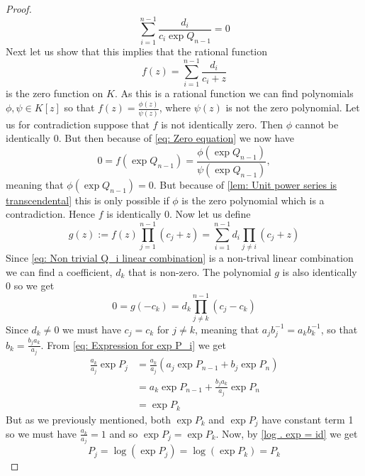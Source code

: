\documentclass{article}
\numberwithin{equation}{section}
\begin{document}
\begin{proof}
\begin{equation}
        \sum_{i=1}^{n-1} \frac{d_i}{c_i \exp Q_{n-1}} = 0
    \end{equation}
    Next let us show that this implies that the rational function
    $$f(z) = \sum_{i=1}^{n-1}\frac{d_i}{c_i + z}$$
    is the zero function on $K$. As this is a rational function we can find polynomials $\phi, \psi \in K[z]$ so that $f(z) = \frac{\phi(z)}{\psi(z)}$, where $\psi(z)$ is not the zero polynomial. Let us for contradiction suppose that $f$ is not identically zero. Then $\phi$ cannot be identically 0. But then because of \cref{eq: Zero equation} we now have
    $$0 = f(\exp Q_{n-1}) = \frac{\phi(\exp Q_{n-1})}{\psi(\exp Q_{n-1})},$$
    meaning that $\phi(\exp Q_{n-1}) = 0$. But because of \cref{lem: Unit power series is transcendental} this is only possible if $\phi$ is the zero polynomial which is a contradiction. Hence $f$ is identically 0. Now let us define
    $$g(z) := f(z) \prod_{j=1}^{n-1}(c_j + z)  = \sum_{i = 1}^{n-1}d_i\prod_{j \neq i}(c_j + z)$$
    Since \cref{eq: Non trivial Q_i linear combination} is a non-trival linear combination we can find a coefficient, $d_k$ that is non-zero. The polynomial $g$ is also identically 0 so we get $$0 = g(-c_k) = d_k\prod_{j \neq k}^{n-1} (c_j - c_k)$$
    Since $d_k \neq 0$ we must have $c_j = c_k$ for $j \neq k$, meaning that $a_j b_j^{-1} = a_k b_k^{-1}$, so that $b_k = \frac{b_j a_k}{a_j}$. From \cref{eq: Expression for exp P_i} we get
    \begin{align*}
        \frac{a_k}{a_j}\exp P_j & = \frac{a_k}{a_j}(a_j \exp P_{n-1} + b_j \exp P_n) \\
                                & = a_k \exp P_{n-1} + \frac{b_j a_k}{a_j} \exp P_n  \\
                                & = \exp P_k
    \end{align*}
    But as we previously mentioned, both $\exp P_k$ and $\exp P_j$ have constant term 1 so we must have $\frac{a_k}{a_j} = 1$ and so $\exp P_j = \exp P_k$. Now, by \cref{log . exp = id} we get 
    $$P_j = \log(\exp P_j) = \log(\exp P_k) = P_k$$
\end{proof}
\end{document}
